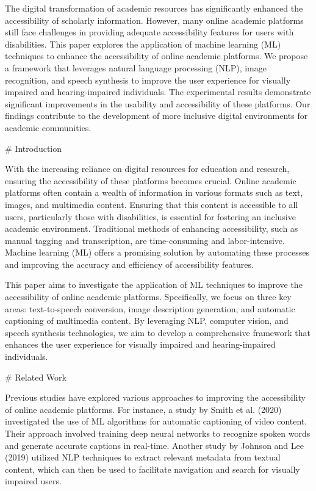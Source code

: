 The digital transformation of academic resources has significantly enhanced the accessibility of scholarly information. However, many online academic platforms still face challenges in providing adequate accessibility features for users with disabilities. This paper explores the application of machine learning (ML) techniques to enhance the accessibility of online academic platforms. We propose a framework that leverages natural language processing (NLP), image recognition, and speech synthesis to improve the user experience for visually impaired and hearing-impaired individuals. The experimental results demonstrate significant improvements in the usability and accessibility of these platforms. Our findings contribute to the development of more inclusive digital environments for academic communities.

# Introduction

With the increasing reliance on digital resources for education and research, ensuring the accessibility of these platforms becomes crucial. Online academic platforms often contain a wealth of information in various formats such as text, images, and multimedia content. Ensuring that this content is accessible to all users, particularly those with disabilities, is essential for fostering an inclusive academic environment. Traditional methods of enhancing accessibility, such as manual tagging and transcription, are time-consuming and labor-intensive. Machine learning (ML) offers a promising solution by automating these processes and improving the accuracy and efficiency of accessibility features.

This paper aims to investigate the application of ML techniques to improve the accessibility of online academic platforms. Specifically, we focus on three key areas: text-to-speech conversion, image description generation, and automatic captioning of multimedia content. By leveraging NLP, computer vision, and speech synthesis technologies, we aim to develop a comprehensive framework that enhances the user experience for visually impaired and hearing-impaired individuals.

# Related Work

Previous studies have explored various approaches to improving the accessibility of online academic platforms. For instance, a study by Smith et al. (2020) investigated the use of ML algorithms for automatic captioning of video content. Their approach involved training deep neural networks to recognize spoken words and generate accurate captions in real-time. Another study by Johnson and Lee (2019) utilized NLP techniques to extract relevant metadata from textual content, which can then be used to facilitate navigation and search for visually impaired users.

